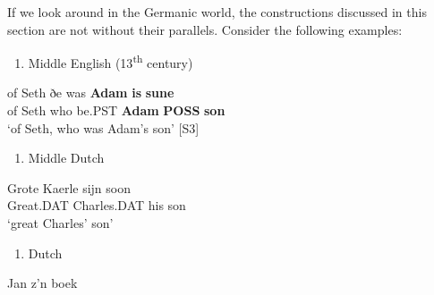 If we look around in the Germanic world, the constructions discussed in this section are not without their parallels. Consider the following examples: 

\begin{enumerate} %
\item 
\label{bkm:Ref126571184}Middle English (13\textsuperscript{th} century)
\end{enumerate} %
\ea\label{}
\gll of  Seth  ðe  was  \textbf{Adam} \textbf{is} \textbf{sune}\\


of  Seth  who  be.PST  \textbf{Adam} \textbf{POSS} \textbf{son}\\ %


‘of Seth, who was Adam’s son’ [S3]
\z

\begin{enumerate} %
\item 
\label{bkm:Ref151373829}Middle Dutch

\end{enumerate} %
\ea\label{}
\gll Grote  Kaerle  sijn  soon\\


Great.DAT  Charles.DAT  his  son\\ %


‘great Charles’ son’
\z


\begin{enumerate} %
\item 
Dutch

\end{enumerate} %
\ea\label{}
\gll Jan  z’n  boek\\


